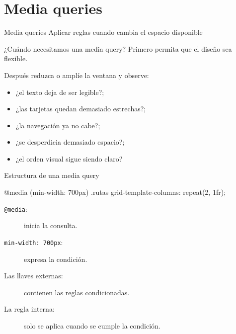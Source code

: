 \documentclass[aspectratio=169,11pt]{beamer}
\begin{document}
    \section{Media queries}

    \SectionSlide
    {Media queries}
    {Aplicar reglas cuando cambia el espacio disponible}

    \begin{frame}{¿Cuándo necesitamos una media query?}
        Primero permita que el diseño sea flexible.

        Después reduzca o amplíe la ventana y observe:

        \begin{itemize}
            \item ¿el texto deja de ser legible?;
            \item ¿las tarjetas quedan demasiado estrechas?;
            \item ¿la navegación ya no cabe?;
            \item ¿se desperdicia demasiado espacio?;
            \item ¿el orden visual sigue siendo claro?
        \end{itemize}

    \end{frame}

    \begin{frame}[fragile]{Estructura de una media query}
        \begin{csscodedark}
            @media (min-width: 700px) {
                .rutas {
                    grid-template-columns: repeat(2, 1fr);
                }
            }
        \end{csscodedark}

        \begin{description}
            \item[\texttt{@media}:] inicia la consulta.
            \item[\texttt{min-width: 700px}:] expresa la condición.
            \item[Las llaves externas:] contienen las reglas condicionadas.
            \item[La regla interna:] solo se aplica cuando se cumple la condición.
        \end{description}
    \end{frame}
\end{document}
